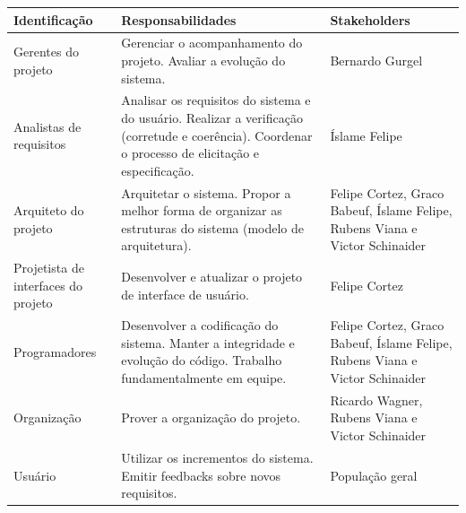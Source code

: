 \documentclass[12pt, a4paper]{article}
\begin{document}
            \begin{longtabu}{X[-1] | X | X[-1]}
                \hline
                \textbf{Identificação} &
                \textbf{Responsabilidades} &
                \textbf{Stakeholders}
                \\ \hline

                Gerentes do projeto &
                Gerenciar o acompanhamento do projeto. Avaliar a evolução do
                sistema. &
                Bernardo Gurgel
                \\ \hline

                Analistas de requisitos &
                Analisar os requisitos do sistema e do usuário. Realizar a
                verificação (corretude e coerência). Coordenar o processo de
                elicitação e especificação. &
                Íslame Felipe
                \\ \hline

                Arquiteto do projeto &
                Arquitetar o sistema. Propor a melhor forma de organizar as
                estruturas do sistema (modelo de arquitetura). &
                Felipe Cortez, Graco Babeuf, Íslame Felipe, Rubens Viana e
                Victor Schinaider
                \\ \hline

                Projetista de interfaces do projeto &
                Desenvolver e atualizar o projeto de interface de usuário. &
                Felipe Cortez
                \\ \hline

                Programadores &
                Desenvolver a codificação do sistema. Manter a integridade e
                evolução do código. Trabalho fundamentalmente em equipe. &
                Felipe Cortez, Graco Babeuf, Íslame Felipe, Rubens Viana e
                Victor Schinaider
                \\ \hline

                Organização &
                Prover a organização do projeto. &
                Ricardo Wagner, Rubens Viana e Victor Schinaider
                \\ \hline

                Usuário &
                Utilizar os incrementos do sistema. Emitir feedbacks sobre
                novos requisitos. &
                População geral
                \\ \hline
            \end{longtabu}
\end{document}
